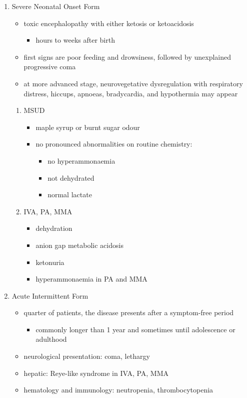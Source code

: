 \documentclass{scrartcl}
\begin{document}
\begin{enumerate}
\item Severe Neonatal Onset Form
\label{sec:org3f583d4}
\begin{itemize}
\item toxic encephalopathy with either ketosis or ketoacidosis
\begin{itemize}
\item hours to weeks after birth
\end{itemize}
\item first signs are poor feeding and drowsiness, followed by unexplained
progressive coma
\item at more advanced stage, neurovegetative dysregulation with
respiratory distress, hiccups, apnoeas, bradycardia, and hypothermia
may appear
\end{itemize}

\begin{enumerate}
\item MSUD
\label{sec:orgdeb1708}
\begin{itemize}
\item maple syrup or burnt sugar odour
\item no pronounced abnormalities on routine chemistry:
\begin{itemize}
\item no hyperammonaemia
\item not dehydrated
\item normal lactate
\end{itemize}
\end{itemize}
\item IVA, PA, MMA
\label{sec:org47663e4}
\begin{itemize}
\item dehydration
\item anion gap metabolic acidosis
\item ketonuria
\item hyperammonaemia in PA and MMA
\end{itemize}
\end{enumerate}

\item Acute Intermittent Form
\label{sec:orgf524b2d}
\begin{itemize}
\item quarter of patients, the disease presents after a symptom-free
period
\begin{itemize}
\item commonly longer than 1 year and sometimes until adolescence or adulthood
\end{itemize}
\item neurological presentation: coma, lethargy
\item hepatic: Reye-like syndrome in IVA, PA, MMA
\item hematology and immunology: neutropenia, thrombocytopenia
\end{itemize}


\end{enumerate}
\end{document}
